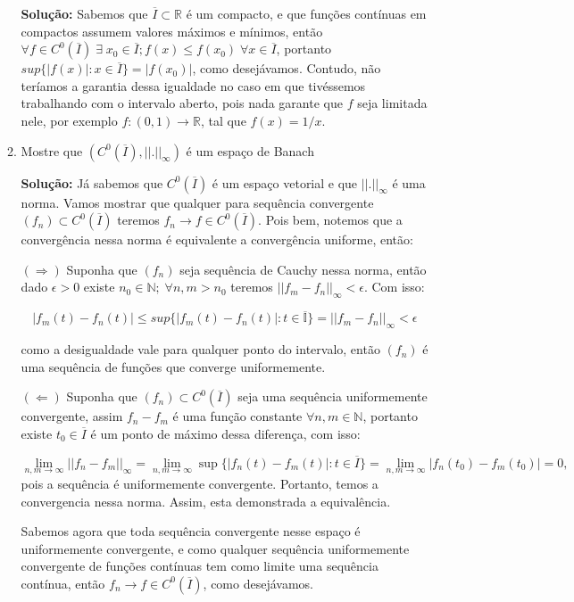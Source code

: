 \documentclass{article}
\begin{document}
\begin{enumerate}
\begin{enumerate}
			\textbf{Solução:} Sabemos que $\overline{I} \subset \mathbb{R}$ é um compacto, e que funções contínuas em compactos assumem valores máximos e mínimos, então $\forall f \in C^0(\overline{I}) \; \exists \; x_0 \in \overline{I}; f(x) \leq f(x_0) \; \forall x \in \overline{I}$, portanto $sup\{|f(x)|: x \in \overline{I}\} = |f(x_0)|$, como desejávamos. Contudo, não teríamos a garantia dessa igualdade no caso em que tivéssemos trabalhando com o intervalo aberto, pois nada garante que $f$ seja limitada nele, por exemplo $f: (0,1) \to \mathbb{R}$, tal que $f(x) = 1/x$.
			
			\item Mostre que $(C^0(\overline{I}), ||.||_{\infty})$ é um espaço de Banach
			
			\textbf{Solução:} Já sabemos que $C^0(\overline{I})$ é um espaço vetorial e que $||.||_{\infty}$ é uma norma. Vamos mostrar que qualquer para sequência convergente $(f_n) \subset C^0(\overline{I})$ teremos $f_n \to f \in C^0(\overline{I})$. Pois bem, notemos que a convergência nessa norma é equivalente a convergência uniforme, então:
			
			$(\Rightarrow)$ Suponha que $(f_n)$ seja sequência de Cauchy nessa norma, então dado $\epsilon > 0$ existe $n_0 \in \mathbb{N}; \; \forall n,m >n_0$ teremos $||f_m-f_n||_{\infty} < \epsilon$. Com isso:
			
			$$
			|f_m(t)-f_n(t)| \leq sup\{|f_m(t)-f_n(t)|: t \in \mathbb{\overline{I}}\}  = ||f_m-f_n||_{\infty} < \epsilon
			$$
			
			como a desigualdade vale para qualquer ponto do intervalo, então $(f_n)$ é uma sequência de funções que converge uniformemente. 
			
			$(\Leftarrow)$ Suponha que $(f_n) \subset C^0(\overline{I})$ seja uma sequência uniformemente convergente, assim $f_n -f_m$ é uma função constante $\forall n, m \in \mathbb{N}$, portanto existe $t_0 \in \overline{I}$ é um ponto de máximo dessa diferença, com isso:
			
			$$
			\lim \limits_{n,m \to \infty} ||f_n  - f_m ||_{\infty} =  \lim \limits_{n,m \to \infty} \sup \{|f_n(t) - f_m(t)|: t\in \overline{I}\} = \lim \limits_{n,m \to \infty} |f_n(t_0) - f_m(t_0)| = 0,
			$$
			pois a sequência é uniformemente convergente. Portanto, temos a convergencia nessa norma. Assim, esta demonstrada a equivalência. 
			
			Sabemos agora que toda sequência convergente nesse espaço é uniformemente convergente, e como qualquer sequência uniformemente convergente de funções contínuas tem como limite uma sequência contínua, então $f_n \to f \in C^0(\overline{I})$, como desejávamos.
			
		\end{enumerate}
		
	\end{enumerate}
		
\end{document}
